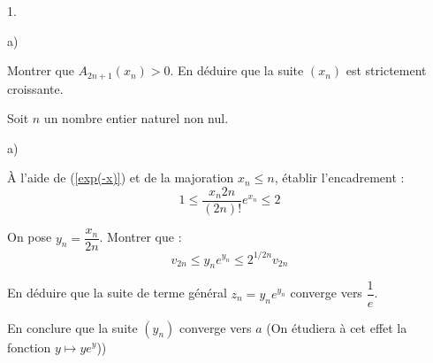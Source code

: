 \documentclass[11pt]{article}%
\begin{document}
\begin{noliste}{1.}
\begin{noliste}{a)}
\item Montrer que $A_{2n + 1}(x_{n})>0$. En déduire que la suite
$(x_{n})$ est
strictement croissante.
\end{noliste}

\item Soit $n$ un nombre entier naturel non nul.

\begin{noliste}{a)}
 \setlength{\itemsep}{2mm}
\item À l'aide de (\ref{exp(-x)}) et de la majoration $x_{n}\leq n$,
établir l'encadrement : 
\[
1\leq \dfrac{x_{n}{2n}}{(2n)!}e^{x_{n}}\leq 2
\]

\item On pose $y_{n} = \dfrac{x_{n}}{2n}$. Montrer que : 
\[
v_{2n}\leq y_{n}e^{y_{n}}\leq 2^{1/2n}v_{2n}
\]

\item En déduire que la suite de terme général $z_{n} = y_{n}e^{y_{n}}$
converge vers $\dfrac{1}{e}$.
\end{noliste}

\item En conclure que la suite $(y_{n})$ converge vers $a$ (On étudiera
à
cet effet la fonction $y\mapsto ye^{y}$))
\end{noliste}

\label{fin}
\end{document}

